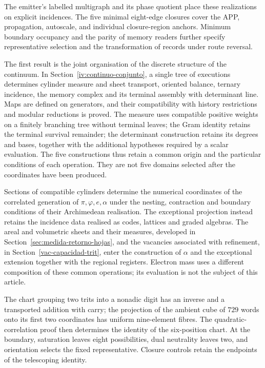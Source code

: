 The emitter's labelled multigraph and its phase quotient place these
realizations on explicit incidences. The five minimal eight-edge closures
cover the APP, propagation, autoscale, and individual closure-region
anchors. Minimum boundary occupancy and the parity of memory readers
further specify representative selection and the transformation of
records under route reversal.

The first result is the joint organisation of the discrete structure
of the continuum. In Section~\ref{iv:continuo-conjunto}, a single tree
of executions determines cylinder measure and sheet transport,
oriented balance, ternary incidence, the memory complex and its terminal
assembly with determinant line. Maps are defined on generators, and
their compatibility with history restrictions and modular reductions
is proved. The measure uses compatible positive weights on a finitely
branching tree without terminal leaves; the Gram identity retains the
terminal survival remainder; the determinant construction retains its
degrees and bases, together with the additional hypotheses required by
a scalar evaluation. The five constructions thus retain a common origin
and the particular conditions of each operation. They are not five
domains selected after the coordinates have been produced.

Sections of compatible cylinders determine the numerical coordinates of
the correlated generation of \(\pi,\varphi,e,\alpha\) under the
nesting, contraction and boundary conditions of their Archimedean
realisation. The exceptional projection instead retains the incidence
data realised as codes, lattices and graded algebras. The areal and
volumetric sheets and their measures, developed in
Section~\ref{sec:medida-retorno-hojas}, and the vacancies associated
with refinement, in Section~\ref{vac-capacidad-trit}, enter the
construction of \(\alpha\) and the exceptional extension together
with the regional registers. Electron mass uses a different composition
of these common operations; its evaluation is not the subject of this
article.

The chart grouping two trits into a nonadic digit has an inverse and
a transported addition with carry; the projection of the ambient cube
of \(729\) words onto its first two coordinates has uniform nine-element
fibres. The quadratic-correlation proof then
determines the identity of the six-position chart. At the boundary,
saturation leaves eight possibilities, dual neutrality leaves two,
and orientation selects the fixed representative. Closure controls retain
the endpoints of the telescoping identity. 

